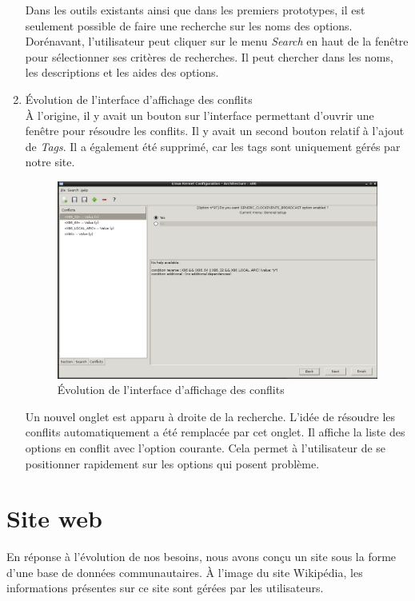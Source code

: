 \documentclass[17pts]{report}
\begin{document}
\begin{enumerate}
    Dans les outils existants ainsi que dans les premiers prototypes, il est
    seulement possible de faire une recherche sur les noms des options.
    Dorénavant, l'utilisateur peut cliquer sur le menu \textit{Search} en haut
    de la fenêtre pour sélectionner ses critères de recherches. Il peut chercher
    dans les noms, les descriptions et les aides des options.

    \pagebreak

    \item Évolution de l'interface d'affichage des conflits \\

    À l'origine, il y avait un bouton sur l'interface permettant d'ouvrir une
    fenêtre pour résoudre les conflits. Il y avait un second bouton relatif à
    l'ajout de \textit{Tags}. Il a également été supprimé, car les tags sont
    uniquement gérés par notre site.

    \begin{figure}[H]
        \includegraphics[scale=0.5]{./illustrations/screen_options_conflits_interface.png}
        \centering
        \caption{Évolution de l'interface d'affichage des conflits}
        \label{fig:Evo_affichage_conflits}
    \end{figure}

    Un nouvel onglet est apparu à droite de la recherche. L'idée de résoudre
    les conflits automatiquement a été remplacée par cet onglet. Il affiche la
    liste des options en conflit avec l'option courante. Cela permet à
    l'utilisateur de se positionner rapidement sur les options qui posent
    problème.
\end{enumerate}

\newpage
\section{Site web}
\label{sec:Site web}
En réponse à l'évolution de nos besoins, nous avons conçu un site sous la forme
d'une base de données communautaires. À l'image du site Wikipédia, les
informations présentes sur ce site sont gérées par les utilisateurs.\\
\end{document}
